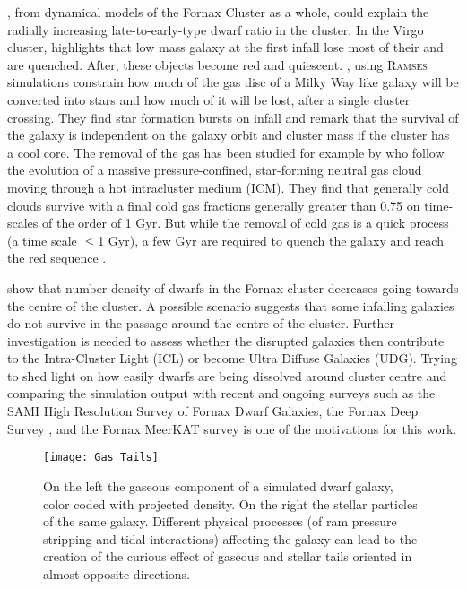 \citet{DeRijcke2010}, from dynamical models of the Fornax Cluster as a whole, could explain the radially increasing late-to-early-type dwarf ratio in the cluster.
In the Virgo cluster, \citet{Boselli2008} highlights that low mass galaxy at the first infall lose most of their \Hi{} and are quenched.
After, these objects become red and quiescent.
\citet{Ruggiero2017}, using \textsc{Ramses} simulations constrain how much of the gas disc of a Milky Way like galaxy will be converted into stars and how much of it will be lost, after a single cluster crossing.
They find star formation bursts on infall and remark that the survival of the galaxy is independent on the galaxy orbit and cluster mass if the cluster has a cool core.
The removal of the gas has been studied for example by \cite{Calura2020} who follow the evolution of a massive pressure-confined, star-forming neutral gas cloud moving through a hot intracluster medium (ICM).
They find that generally cold clouds survive with a final cold gas fractions generally greater than 0.75 on time-scales of the order of 1 Gyr.
But while the removal of cold gas is a quick process (a time scale $\leq$1 Gyr), a few Gyr are required to quench the galaxy and reach the red sequence \citep{Cortese2009}.


\citet{Venhola2018} show that number density of dwarfs in the Fornax cluster decreases going towards the centre of the cluster. A possible scenario suggests that some infalling galaxies do not survive in the passage around the centre of the cluster.
Further investigation is needed to assess  whether the disrupted galaxies then contribute to the Intra-Cluster Light (ICL) or become Ultra Diffuse Galaxies (UDG).
Trying to shed light on how easily dwarfs are being dissolved around cluster centre and comparing the simulation output with recent and ongoing surveys such as the SAMI High Resolution Survey of Fornax Dwarf Galaxies, \citep{Owers2019, Scott2018}
the Fornax Deep Survey \citep{Venhola2018}, and the Fornax MeerKAT survey \citep{Loni2021} is one of the motivations for this work.



\begin{figure}
  \centering
  \texttt{[image: Gas\_Tails]}
  \caption{On the left the gaseous component of a simulated dwarf galaxy, color coded with projected density.
    On the right the stellar particles of the same galaxy.
   Different physical processes (of ram pressure stripping and tidal interactions) affecting the galaxy can lead to the creation of the curious effect of gaseous and stellar tails oriented in almost opposite directions.}
  \label{fig:tails}
\end{figure}


